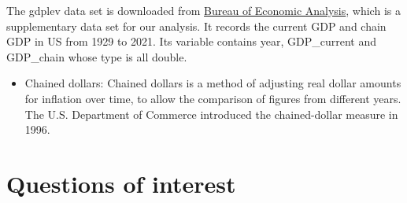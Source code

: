 \documentclass[
]{article}
\providecommand{\tightlist}{%
  \setlength{\itemsep}{0pt}\setlength{\parskip}{0pt}}
\begin{document}
The gdplev data set is downloaded from \href{https://www.bea.gov/data/gdp/gross-domestic-product}{Bureau of Economic Analysis}, which is a supplementary data set for our analysis. It records the current GDP and chain GDP in US from 1929 to 2021. Its variable contains year, GDP\_current and GDP\_chain whose type is all double.

\begin{itemize}
\tightlist
\item
  Chained dollars: Chained dollars is a method of adjusting real dollar amounts for inflation over time, to allow the comparison of figures from different years. The U.S. Department of Commerce introduced the chained-dollar measure in 1996.
\end{itemize}

\hypertarget{questions-of-interest}{%
\section{Questions of interest}\label{questions-of-interest}}
\end{document}
